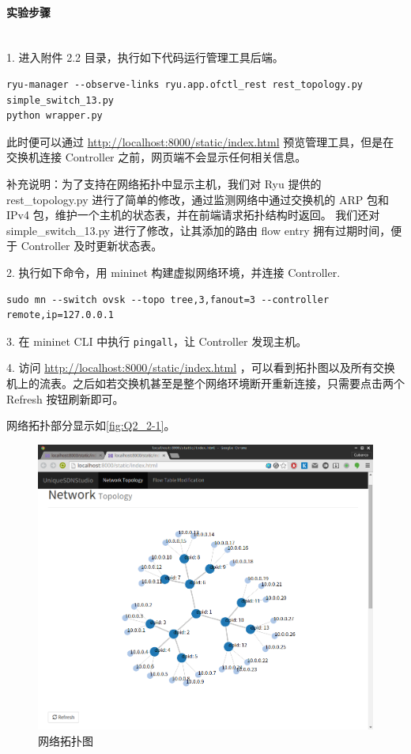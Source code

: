 \documentclass[format=draft,language=chinese,category=SDN]{hustreport}
\newcommand{\myparagraph}[1]{\paragraph{#1}\mbox{}\\}
\newcommand{\code}{\texttt}
\begin{document}
\myparagraph{实验步骤}
1. 进入附件 2.2 目录，执行如下代码运行管理工具后端。

\begin{lstlisting}
ryu-manager --observe-links ryu.app.ofctl_rest rest_topology.py simple_switch_13.py
python wrapper.py
\end{lstlisting}

此时便可以通过 \url{http://localhost:8000/static/index.html} 预览管理工具，但是在交换机连接 Controller 之前，网页端不会显示任何相关信息。

补充说明：为了支持在网络拓扑中显示主机，我们对 Ryu 提供的 rest\_topology.py 进行了简单的修改，通过监测网络中通过交换机的 ARP 包和 IPv4 包，维护一个主机的状态表，并在前端请求拓扑结构时返回。 我们还对 simple\_switch\_13.py 进行了修改，让其添加的路由 flow entry 拥有过期时间，便于 Controller 及时更新状态表。

2. 执行如下命令，用 mininet 构建虚拟网络环境，并连接 Controller.
\begin{lstlisting}
sudo mn --switch ovsk --topo tree,3,fanout=3 --controller remote,ip=127.0.0.1
\end{lstlisting}

3. 在 mininet CLI 中执行 \code{pingall}，让 Controller 发现主机。

4. 访问 \url{http://localhost:8000/static/index.html} ，可以看到拓扑图以及所有交换机上的流表。之后如若交换机甚至是整个网络环境断开重新连接，只需要点击两个 Refresh 按钮刷新即可。

网络拓扑部分显示如\autoref{fig:Q2_2-1}。

\begin{figure}[!h]
\centering
\includegraphics[width=.7\textwidth]{fig/2_2-1.png}
\caption{网络拓扑图}\label{fig:Q2_2-1}
\end{figure}
\end{document}
